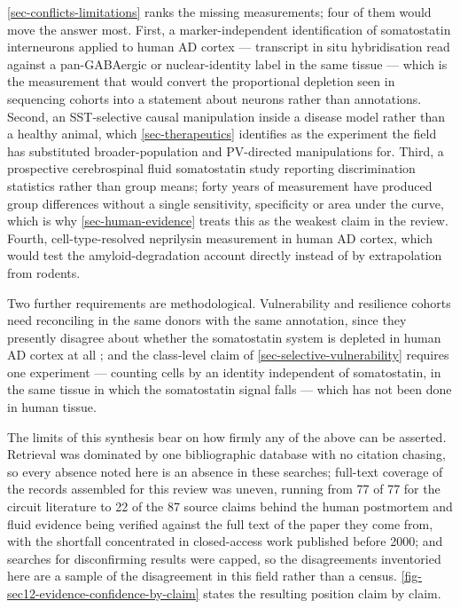 \documentclass[11pt]{article}
\begin{document}
\ref{sec-conflicts-limitations} ranks the missing measurements; four of them would move the answer most. First, a marker-independent identification of somatostatin interneurons applied to human AD cortex --- transcript in situ hybridisation read against a pan-GABAergic or nuclear-identity label in the same tissue --- which is the measurement that would convert the proportional depletion seen in sequencing cohorts into a statement about neurons rather than annotations. Second, an SST-selective causal manipulation inside a disease model rather than a healthy animal, which \ref{sec-therapeutics} identifies as the experiment the field has substituted broader-population and PV-directed manipulations for. Third, a prospective cerebrospinal fluid somatostatin study reporting discrimination statistics rather than group means; forty years of measurement have produced group differences without a single sensitivity, specificity or area under the curve, which is why \ref{sec-human-evidence} treats this as the weakest claim in the review. Fourth, cell-type-resolved neprilysin measurement in human AD cortex, which would test the amyloid-degradation account directly instead of by extrapolation from rodents.

Two further requirements are methodological. Vulnerability and resilience cohorts need reconciling in the same donors with the same annotation, since they presently disagree about whether the somatostatin system is depleted in human AD cortex at all \citep{SaizSanchez2014,Morgan2024a}; and the class-level claim of \ref{sec-selective-vulnerability} requires one experiment --- counting cells by an identity independent of somatostatin, in the same tissue in which the somatostatin signal falls --- which has not been done in human tissue.

The limits of this synthesis bear on how firmly any of the above can be asserted. Retrieval was dominated by one bibliographic database with no citation chasing, so every absence noted here is an absence in these searches; full-text coverage of the records assembled for this review was uneven, running from 77 of 77 for the circuit literature to 22 of the 87 source claims behind the human postmortem and fluid evidence being verified against the full text of the paper they come from, with the shortfall concentrated in closed-access work published before 2000; and searches for disconfirming results were capped, so the disagreements inventoried here are a sample of the disagreement in this field rather than a census. \ref{fig-sec12-evidence-confidence-by-claim} states the resulting position claim by claim.
\end{document}
